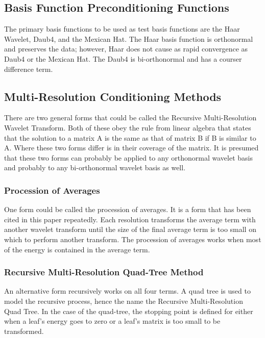 \subsection {Basis Function Preconditioning Functions}
The primary basis functions to be used as test basis functions are the Haar Wavelet, Daub4, and the Mexican Hat.  The Haar basis function is orthonormal and preserves the data; however, Haar does not cause as rapid convergence as Daub4 or the Mexican Hat.  The Daub4 is bi-orthonormal and has a courser difference term.  %

\subsection {Multi-Resolution Conditioning Methods}
There are two general forms that could be called the Recursive Multi-Resolution Wavelet Transform.  Both of these obey the rule from linear algebra that states that the solution to a matrix A is the same as that of matrix B if B is similar to A.   Where these two forms differ is in their coverage of the matrix.  It is presumed that these two forms can probably be applied to any orthonormal wavelet basis and probably to any bi-orthonormal wavelet basis as well.  

\subsubsection {Procession of Averages}
One form could be called the procession of averages.  It is a form that has been cited in this paper repeatedly.   Each resolution transforms the average term with another wavelet transform until the size of the final average term is too small on which to perform another transform.  %
The procession of averages works when most of the energy is contained in the average term.

\subsubsection {Recursive Multi-Resolution Quad-Tree Method}
An alternative form recursively works on all four terms.  A quad tree is used to model the recursive process, hence the name the Recursive Multi-Resolution Quad Tree.   In the case of the quad-tree, the stopping point is defined for either when a leaf's energy goes to zero or a leaf's matrix is too small to be transformed.  

